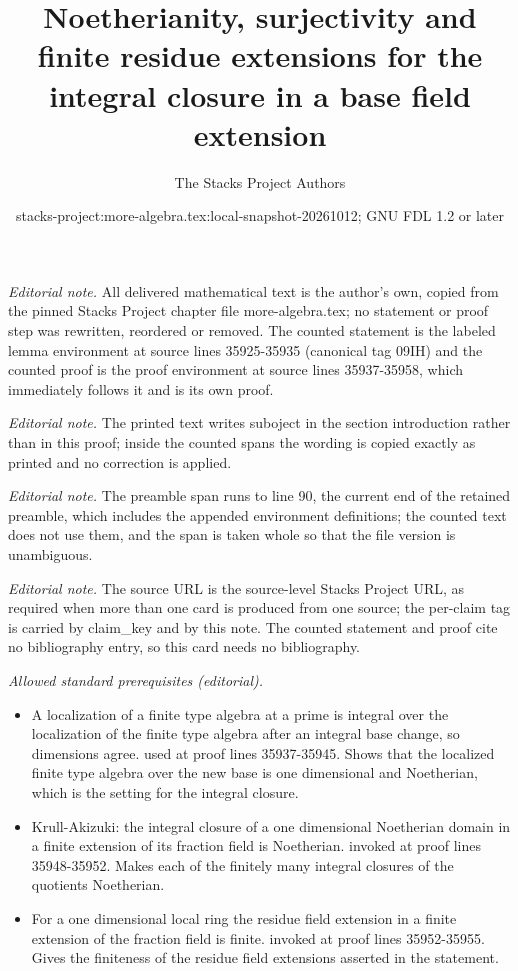 \documentclass[10pt,a4paper]{amsart}
\title{Noetherianity, surjectivity and finite residue extensions for the integral closure in a base field extension}
\author{The Stacks Project Authors}
\date{stacks-project:more-algebra.tex:local-snapshot-20261012; GNU FDL 1.2 or later}
\theoremstyle{plain}
\theoremstyle{definition}
\theoremstyle{remark}
\numberwithin{equation}{subsection}
\begin{document}
\maketitle
\setcounter{subsection}{1}
\noindent\textit{Editorial note.} All delivered mathematical text is the author's own, copied from the pinned Stacks Project chapter file more-algebra.tex; no statement or proof step was rewritten, reordered or removed. The counted statement is the labeled lemma environment at source lines 35925-35935 (canonical tag 09IH) and the counted proof is the proof environment at source lines 35937-35958, which immediately follows it and is its own proof.\par\medskip
\noindent\textit{Editorial note.} The printed text writes suboject in the section introduction rather than in this proof; inside the counted spans the wording is copied exactly as printed and no correction is applied.\par\medskip
\noindent\textit{Editorial note.} The preamble span runs to line 90, the current end of the retained preamble, which includes the appended environment definitions; the counted text does not use them, and the span is taken whole so that the file version is unambiguous.\par\medskip
\noindent\textit{Editorial note.} The source URL is the source-level Stacks Project URL, as required when more than one card is produced from one source; the per-claim tag is carried by claim\_key and by this note. The counted statement and proof cite no bibliography entry, so this card needs no bibliography.\par\medskip
\noindent\textit{Allowed standard prerequisites (editorial).}\begin{itemize}
\item A localization of a finite type algebra at a prime is integral over the localization of the finite type algebra after an integral base change, so dimensions agree. used at proof lines 35937-35945. Shows that the localized finite type algebra over the new base is one dimensional and Noetherian, which is the setting for the integral closure.
\item Krull-Akizuki: the integral closure of a one dimensional Noetherian domain in a finite extension of its fraction field is Noetherian. invoked at proof lines 35948-35952. Makes each of the finitely many integral closures of the quotients Noetherian.
\item For a one dimensional local ring the residue field extension in a finite extension of the fraction field is finite. invoked at proof lines 35952-35955. Gives the finiteness of the residue field extensions asserted in the statement.
\end{itemize}\medskip
\end{document}
